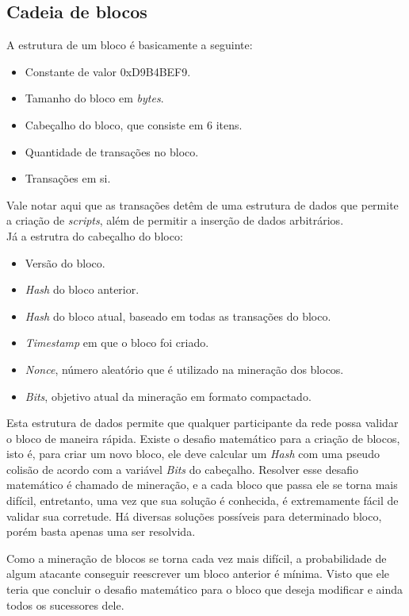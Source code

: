 \documentclass{ufsctex/ufsctex}
\begin{document}
\subsection{Cadeia de blocos}

A estrutura de um bloco é basicamente a seguinte:
\begin{itemize}
	\item Constante de valor 0xD9B4BEF9.
	\item Tamanho do bloco em \textit{bytes}.
	\item Cabeçalho do bloco, que consiste em 6 itens.
	\item Quantidade de transações no bloco.
	\item Transações em si.
\end{itemize}

Vale notar aqui que as transações detêm de uma estrutura de dados que permite a criação
de \textit{scripts}, além de permitir a inserção de dados arbitrários. \\

Já a estrutra do cabeçalho do bloco:
\begin{itemize}
	\item Versão do bloco.
	\item \textit{Hash} do bloco anterior.
	\item \textit{Hash} do bloco atual, baseado em todas as transações do bloco.
	\item \textit{Timestamp} em que o bloco foi criado.
	\item \textit{Nonce}, número aleatório que é utilizado na mineração dos blocos.
	\item \textit{Bits}, objetivo atual da mineração em formato compactado.
\end{itemize}

Esta estrutura de dados permite que qualquer participante da rede possa validar o
bloco de maneira rápida. Existe o desafio matemático para a criação de blocos, isto é,
para criar um novo bloco, ele deve calcular um \textit{Hash} com uma pseudo colisão de acordo
com a variável \textit{Bits} do cabeçalho. Resolver esse desafio matemático é chamado
de mineração, e a cada bloco que passa ele se torna mais difícil, entretanto, uma vez
que sua solução é conhecida, é extremamente fácil de validar sua corretude. Há diversas
soluções possíveis para determinado bloco, porém basta apenas uma ser resolvida.\cite{Antonopoulos}

Como a mineração de blocos se torna cada vez mais difícil, a probabilidade de algum
atacante conseguir reescrever um bloco anterior é mínima. Visto que ele teria que concluir
o desafio matemático para o bloco que deseja modificar e ainda todos os sucessores dele.
\end{document}
